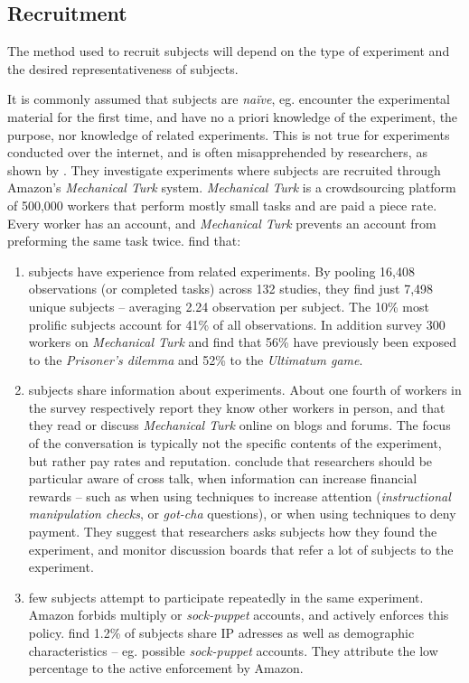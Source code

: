 \documentclass[preprint, 12pt]{elsarticle}
\begin{document}
\subsection{Recruitment}

The method used to recruit subjects will depend on the type of experiment and the desired representativeness of subjects. 

It is commonly assumed that subjects are \emph{naïve}, eg. encounter the experimental material for the first time, and have no a priori knowledge of the experiment, the purpose, nor knowledge of related experiments. This is not true for experiments conducted over the internet, and is often misapprehended by researchers, as shown by \citet*{Chandler_Mueller_Paolacci_2014}. They investigate experiments where subjects are recruited through Amazon's \emph{Mechanical Turk} system. \emph{Mechanical Turk} is a crowdsourcing platform of 500,000 workers that perform mostly small tasks and are paid a piece rate. Every worker has an account, and \emph{Mechanical Turk} prevents an account from preforming the same task twice. \cite{Chandler_Mueller_Paolacci_2014} find that: 

\begin{enumerate}
\item subjects have experience from related experiments. By pooling 16,408 observations (or completed tasks) across 132 studies, they find just 7,498 unique subjects -- averaging 2.24 observation per subject. The 10\% most prolific subjects account for 41\% of all observations. In addition \cite{Chandler_Mueller_Paolacci_2014} survey 300 workers on \emph{Mechanical Turk} and find that 56\% have previously been exposed to the \emph{Prisoner's dilemma} and 52\% to the \emph{Ultimatum game}. 
\item subjects share information about experiments. About one fourth of workers in the \cite{Chandler_Mueller_Paolacci_2014} survey respectively report they know other workers in person, and that they read or discuss \emph{Mechanical Turk} online on blogs and forums. The focus of the conversation is typically not the specific contents of the experiment, but rather pay rates and reputation. \cite{Chandler_Mueller_Paolacci_2014} conclude that researchers should be particular aware of cross talk, when information can increase financial rewards -- such as when using techniques to increase attention (\emph{instructional manipulation checks}, or \emph{got-cha} questions), or when using techniques to deny payment. They suggest that researchers asks subjects how they found the experiment, and monitor discussion boards that refer a lot of subjects to the experiment.
\item few subjects attempt to participate repeatedly in the same experiment. Amazon forbids multiply or \emph{sock-puppet} accounts, and actively enforces this policy. \cite{Chandler_Mueller_Paolacci_2014} find 1.2\% of subjects share IP adresses as well as demographic characteristics -- eg. possible \emph{sock-puppet} accounts. They attribute the low percentage to the active enforcement by Amazon.
\end{enumerate}
\end{document}
